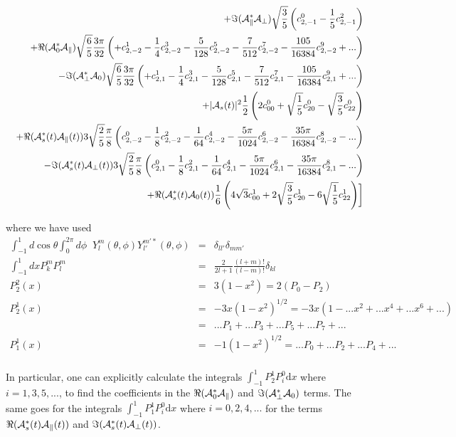\documentclass[a4paper,9pt,twosided]{article}
\begin{document}
\begin{eqnarray}
         &&                   +\Im({\cal A}_\parallel^*{\cal A}_\perp)\sqrt{\frac{3}{5}}\left(c^0_{2,-1}-\frac{1}{5}c^2_{2,-1}\right)  \\
         &&                   +\Re({\cal A}_0^*{\cal A}_\parallel)\sqrt{\frac{6}{5}}\frac{3\pi}{32}\left( +c^1_{2,-2}-\frac{1}{4}c^3_{2,-2}-\frac{5}{128}c^5_{2,-2}-\frac{7}{512}c^7_{2,-2} - \frac{105}{16384}c^9_{2,-2}+... \right) \\
         &&                   -\Im({\cal A}_\perp^* {\cal A}_0 )  \sqrt{\frac{6}{5}}\frac{3\pi}{32}\left( +c^1_{2,1} -\frac{1}{4}c^3_{2,1}- \frac{5}{128}c^5_{2,1} -\frac{7}{512}c^7_{2,1} - \frac{105}{16384}c^9_{2,1}+... \right) \\
          &&                  +|{\cal A}_{s}(t)|^2  \frac{1}{2} \left(2c^0_{00} + \sqrt{\frac{1}{5}}c^0_{20} -\sqrt{\frac{3}{5}} c^0_{22}\right) \\
          &&                  +\Re({\cal A}_{s}^*(t){\cal A}_\parallel(t)) 3 \sqrt{\frac{2}{5}}\frac{\pi}{8} \left(c^0_{2,-2}-\frac{1}{8}c^2_{2,-2}-\frac{1}{64}c^4_{2,-2}-\frac{5\pi}{1024}c^6_{2,-2}-\frac{35\pi}{16384}c^8_{2,-2}-...\right)\\
          &&                  -\Im({\cal A}_{s}^*(t){\cal A}_\perp(t)) 3\sqrt{\frac{2}{5}} \frac{\pi}{8} \left(c^0_{2,1}-\frac{1}{8}c^2_{2,1}-\frac{1}{64}c^4_{2,1}-\frac{5\pi}{1024}c^6_{2,1}-\frac{35\pi}{16384}c^8_{2,1}-...\right)\\
          &&                  +\Re({\cal A}_{s}^*(t){\cal A}_0(t)) \frac{1}{6}\left(4\sqrt{3}  c^1_{00} + 2 \sqrt{\frac{3}{5}} c^1_{20} - 6 \sqrt{\frac{1}{5}}c^1_{22}\right)
      \biggr]
\end{eqnarray}

where we have used 
\begin{eqnarray}
\int_{-1}^1 d\cos\theta \int_0^{2\pi} d\phi \;\;Y_l^m(\theta,\phi) Y_{l'}^{m'*}(\theta,\phi) &=& \delta_{ll'}\delta_{mm'}\\
\int_{-1}^1 dx  P_k^m P_l^m&=& \frac{2}{2l+1}\frac{(l+m)!}{(l-m)!}\delta_{kl} \\
P_2^2(x) &=& 3(1-x^2) = 2(P_0-P_2)\\
P_2^1(x) &=& -3x(1-x^2)^{1/2} = -3x(1-...  x^2 + ... x^4  + ...x^6 + ...) \\
&=& ...P_1 + ...P_3 + ...P_5 +...P_7 + ...\\
P_1^1(x) &=& -1(1-x^2)^{1/2} = ...P_0 + ...P_2 + ...P_4 + ...\\
\end{eqnarray}

In particular, one can explicitly calculate the integrals $\int_{-1}^{1}P_2^1P_i^0\mathrm{d}x$ where  $i = 1,3,5,...$, to find the coefficients in the $\Re({\cal A}_0^*{\cal A}_\parallel)$ and $\Im({\cal A}_\perp^* {\cal A}_0 )$ terms. The same goes for the integrals $\int_{-1}^{1}P_1^1P_i^0\mathrm{d}x$ where $i=0,2,4,...$ for the terms $\Re({\cal A}_{s}^*(t){\cal A}_\parallel(t))$ and $\Im({\cal A}_{s}^*(t){\cal A}_\perp(t))$.
\end{document}
